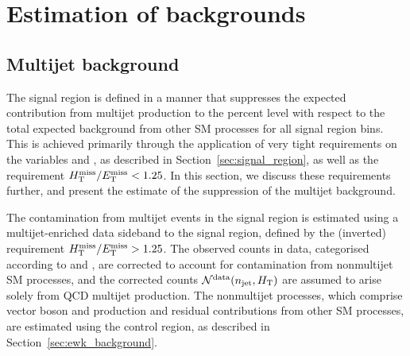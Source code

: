 \section{Estimation of backgrounds}
\label{sec:backgrounds}

\subsection{Multijet background}
\label{sec:qcd_background}

The signal region is defined in a manner that suppresses the expected
contribution from multijet production to the percent level with
respect to the total expected background from other SM processes for
all signal region bins.
This is achieved primarily through the application of very tight
requirements on the variables \alphat and \dphi, as described in
Section~\ref{sec:signal_region}, as well as the requirement $H_{\mathrm{T}}^{\text{miss}} / E_{\mathrm{T}}^{\text{miss}} <
1.25$. In this section, we discuss these requirements further, and
present the estimate of the suppression of the multijet background.


The contamination from multijet events in the signal region is
estimated using a multijet-enriched data sideband to the signal
region, defined by the (inverted) requirement $H_{\mathrm{T}}^{\text{miss}} / E_{\mathrm{T}}^{\text{miss}} > 1.25$. The
observed counts in data, categorised according to \njet and \scalht,
are corrected to account for contamination from nonmultijet SM
processes, and the corrected counts $\mathcal{N}^\text{data}(n_{\text{jet}},
H_{\mathrm{T}})$ are assumed to arise solely from QCD multijet
production. The nonmultijet processes, which comprise vector boson
and \ttbar production and residual contributions from other SM
processes, are estimated using the \mj control region, as 
described in Section~\ref{sec:ewk_background}. 

